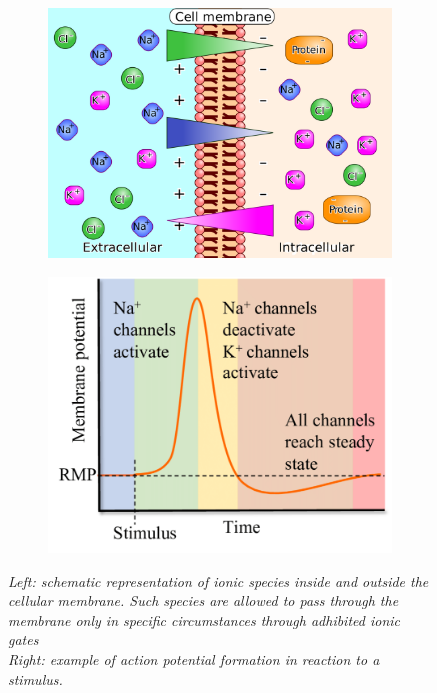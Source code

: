 \documentclass[12pt, a4paper]{report}
\begin{document}
\begin{figure}[H]
	\begin{minipage}{\linewidth}
		\centering
		\begin{minipage}{0.45\linewidth}
			\begin{figure}[H]
				\includegraphics[width=\linewidth]{AP1.png}
				
			\end{figure}
		\end{minipage}
		\hspace{0.05\linewidth}
		\begin{minipage}{0.45\linewidth}
			\begin{figure}[H]
				\includegraphics[width=\linewidth]{AP2.png}
				
			\end{figure}
		\end{minipage}
		
	\end{minipage}
\caption{\textit{Left: schematic representation of ionic species inside and outside the cellular membrane. Such species are allowed to pass through the membrane only in specific circumstances through adhibited ionic gates \\
Right: example of action potential formation in reaction to a stimulus. \cite{43}}}\label{membrane}
\end{figure}
\end{document}
